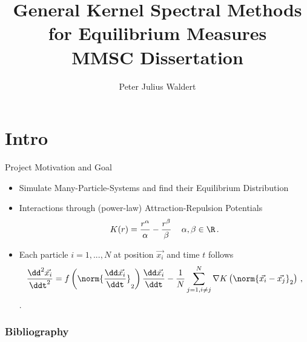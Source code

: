 \documentclass[aspectratio=169,hyperref={colorlinks=true}]{beamer}
\title{General Kernel Spectral Methods for Equilibrium Measures \\ \normalsize MMSC Dissertation}
\author{Peter Julius Waldert}
\institute{Mathematical Institute \\ University of Oxford}
\date{} %
\begin{document}
  {\frame{\titlepage}}

  \section{Intro}
  \begin{frame}{Project Motivation and Goal}
    \begin{itemize}
      \item Simulate Many-Particle-Systems and find their Equilibrium Distribution
      \item Interactions through (power-law) Attraction-Repulsion Potentials
            $$K(r) = \frac{r^\alpha}{\alpha} - \frac{r^\beta}{\beta}\,\quad \alpha, \beta \in \R\,.$$
      \item Each particle $i=1, ..., N$ at position $\vec{x_i}$ and time $t$ follows
            $$\frac{\dd^2 \vec{x_i}}{\ddt^2} = f\left(\norm{\frac{\dd \vec{x_i}}{\ddt}}_2\right) \frac{\dd\vec{x_i}}{\ddt} - \frac{1}{N} \sum_{j=1, i\neq j}^{N} \nabla K\left(\norm{\vec{x_i} - \vec{x_j}}_2\right)\,,$$
            \parencite{2020-power-law-kernels, 2021-arbitrary-dimensions}.
    \end{itemize}
  \end{frame}

  \begin{frame}[allowframebreaks]
    \frametitle{Bibliography}
    \nocite{*}
    \printbibliography[heading=bibnumbered]
  \end{frame}
\end{document}
